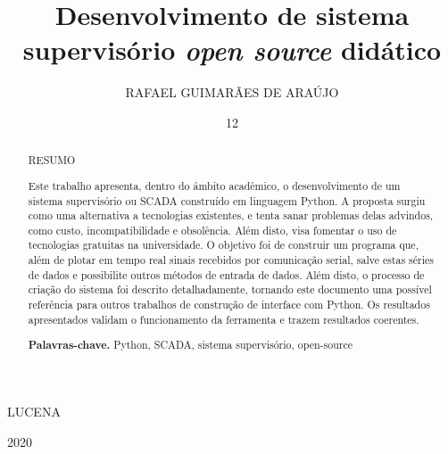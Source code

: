 \documentclass[msc]{pei}
\theoremstyle{definition}
\begin{document}
	\title{Desenvolvimento de sistema supervisório \emph{open source} didático}
	\author{RAFAEL GUIMARÃES DE ARAÚJO}{LUCENA}
	\date{12}{2020}
	
	
	\maketitle
	
	
	
	
	
	
	
	\begin{abstract}
		
		\begin{center}
			RESUMO
		\end{center}
		
		\noindent Este trabalho apresenta, dentro do âmbito acadêmico, o desenvolvimento de um sistema supervisório ou SCADA construído em linguagem Python. A proposta surgiu como uma alternativa a tecnologias existentes, e tenta sanar problemas delas advindos, como custo, incompatibilidade e obsolência. Além disto, visa fomentar o uso de tecnologias gratuitas na universidade. O objetivo foi de construir um programa que, além de plotar em tempo real sinais recebidos por comunicação serial, salve estas séries de dados e possibilite outros métodos de entrada de dados. Além disto, o processo de criação do sistema foi descrito detalhadamente, tornando este documento uma possível referência para outros trabalhos de construção de interface com Python. Os resultados apresentados validam o funcionamento da ferramenta e trazem resultados coerentes.
		
		\noindent \textbf{Palavras-chave.} Python, SCADA, sistema supervisório, open-source
		
	\end{abstract}
	
\end{document}
